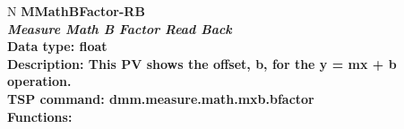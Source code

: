 \documentclass[openany]{article}
\begin{document}
		\begin{tabular}{N}
			\hline
			\bfseries MMathBFactor-RB\label{pv:mmathbfactor-rb} \\ \hline
			\emph{Measure Math B Factor Read Back} \\
			Data type: float \\
			Description: This PV shows the offset, b, for the y = mx + b operation. \\
			TSP command: dmm.measure.math.mxb.bfactor \\
			Functions: \\
			\arrayrulecolor{\FuncTableBorderColor}

		\end{tabular}
\end{document}
